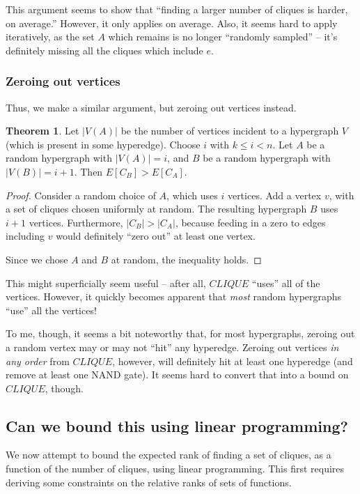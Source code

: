 \documentclass[12pt]{article}
\theoremstyle{definition}
\newtheorem{thm}{Theorem}[section]
\begin{document}
This argument seems to show that ``finding a larger number of cliques is
harder, on average.'' However, it only applies
on average. Also, it seems hard to apply iteratively, as the set $A$ which
remains is no longer ``randomly sampled'' -- it's definitely missing
all the cliques which include $e$.

\subsubsection{Zeroing out vertices}

Thus, we make a similar argument, but zeroing out vertices instead.

\begin{thm}
\label{vertexZonking}
Let $|V(A)|$ be the number of vertices incident to a hypergraph $V$
(which is present in some hyperedge).
Choose $i$ with $k \le i < n$.
Let $A$ be a random hypergraph with $|V(A)| = i$, and
$B$ be a random hypergraph with $|V(B)| = i+1$. Then
$E[C_B] > E[C_A]$.
\end{thm}
\begin{proof}
Consider a random choice of $A$, which uses $i$ vertices.
Add a vertex $v$, with a set of cliques chosen uniformly at
random. The resulting hypergraph $B$ uses $i+1$ vertices.
Furthermore, $|C_B| > |C_A|$, because feeding in a zero to edges
including $v$ would definitely ``zero out'' at least one
vertex.

Since we chose $A$ and $B$ at random, the inequality holds.
\end{proof}

This might superficially seem useful -- after all, $CLIQUE$
``uses'' all of the vertices. However,
it quickly becomes apparent that {\em most} random hypergraphs
``use'' all the vertices!

To me, though, it seems a bit noteworthy that, for most
hypergraphs, zeroing out a random vertex may or may not
``hit'' any hyperedge. Zeroing out vertices {\em in any order}
from $CLIQUE$, however, will definitely hit at least one
hyperedge (and remove at least one NAND gate). It seems
hard to convert that into a bound on $CLIQUE$, though.

\subsection{Can we bound this using linear programming?}

We now attempt to bound the expected rank of finding a set
of cliques, as a function of the number of cliques, using
linear programming.
This first requires deriving some constraints on the
relative ranks of sets of functions.
\end{document}
